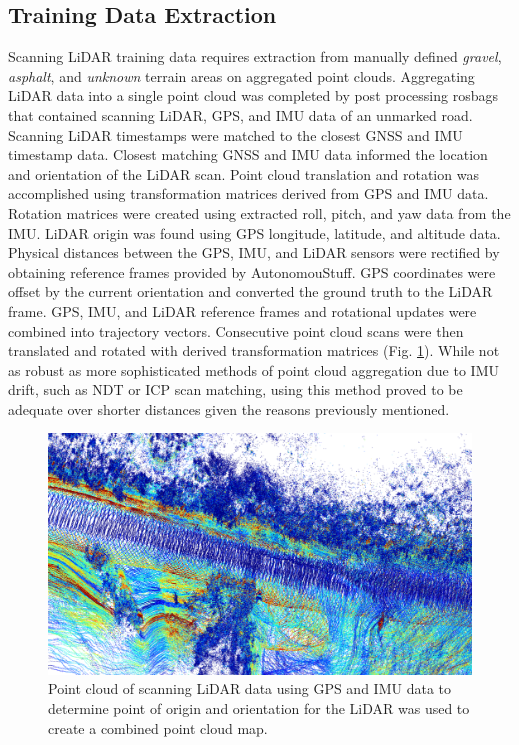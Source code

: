 \documentclass[journal,onecolumn]{IEEEtran}
\begin{document}
		\subsection{Training Data Extraction}
	
			{Scanning LiDAR training data requires extraction from manually defined \textit{gravel}, \textit{asphalt}, and \textit{unknown} terrain areas on aggregated point clouds. Aggregating LiDAR data into a single point cloud was completed by post processing rosbags that contained scanning LiDAR, GPS, and IMU data of an unmarked road. Scanning LiDAR timestamps were matched to the closest GNSS and IMU timestamp data. Closest matching GNSS and IMU data informed the location and orientation of the LiDAR scan. Point cloud translation and rotation was accomplished using transformation matrices derived from GPS and IMU data. Rotation matrices were created using extracted roll, pitch, and yaw data from the IMU. LiDAR origin was found using GPS longitude, latitude, and altitude data. Physical distances between the GPS, IMU, and LiDAR sensors were rectified by obtaining reference frames provided by AutonomouStuff. GPS coordinates were offset by the current orientation and converted the ground truth to the LiDAR frame. GPS, IMU, and LiDAR reference frames and rotational updates were combined into trajectory vectors. Consecutive point cloud scans were then translated and rotated with derived transformation matrices (Fig. \ref{fig:pc_example}). While not as robust as more sophisticated methods of point cloud aggregation due to IMU drift, such as NDT or ICP scan matching, using this method proved to be adequate over shorter distances given the reasons previously mentioned.}
			
			\begin{figure}[H]
				\centering
				\includegraphics[width=0.75\linewidth]{figures/combined_pcd_example}
				\caption[Aggregated Point Cloud Data]{Point cloud of scanning LiDAR data using GPS and IMU data to determine point of origin and orientation for the LiDAR was used to create a combined point cloud map.}
				\label{fig:pc_example}
			\end{figure}
		
\end{document}
